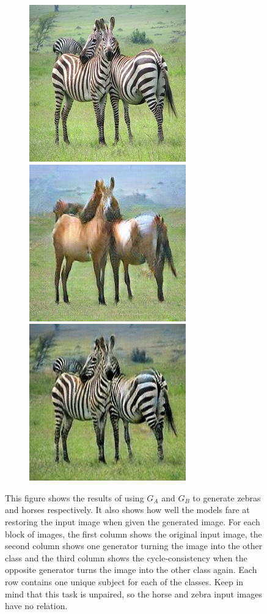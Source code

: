 \documentclass[12pt, fleqn, titlepage]{article}
\newcommand\skipperer{0.45pt}
\newcommand\bigskipx{2.1pt}
\newcommand{\1}[1]{\mathds{1}\left[#1\right]}
\begin{document}
\begin{figure}[H]
\begin{subfigure}[b]{0.8\textwidth}
		\hskip\bigskipx
		\includegraphics[width=0.15\linewidth]{imgs/horse2zebra_cycle/gaussnoise/b-a/51_real_a}
		\hskip\skipperer
		\includegraphics[width=0.15\linewidth]{imgs/horse2zebra_cycle/gaussnoise/b-a/51_fake_b}
		\hskip\skipperer
		\includegraphics[width=0.15\linewidth]{imgs/horse2zebra_cycle/gaussnoise/b-a/51_fake_a}
	\end{subfigure}
	\caption{This figure shows the results of using $G_A$ and $G_B$ to generate zebras and horses respectively. It also shows how well the models fare at restoring the input image when given the generated image. For each block of images, the first column shows the original input image, the second column shows one generator turning the image into the other class and the third column shows the cycle-consistency when the opposite generator turns the image into the other class again. Each row contains one unique subject for each of the classes. Keep in mind that this task is unpaired, so the horse and zebra input images have no relation.}
	\label{fig:testing_cycle_consistency}
\end{figure}
\end{document}
